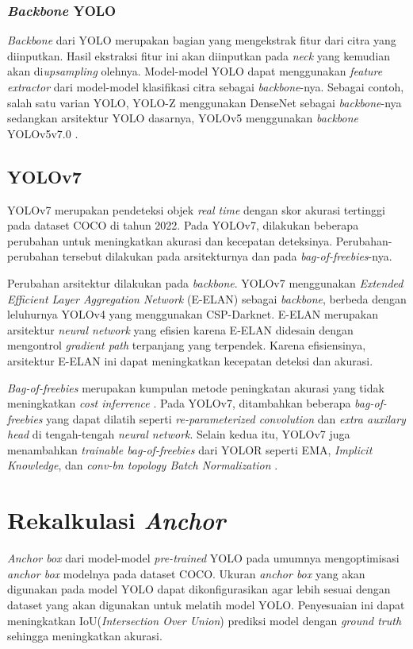     \subsubsection{\emph{Backbone} YOLO}
      \emph{Backbone} dari YOLO merupakan bagian yang mengekstrak fitur dari citra yang diinputkan.
      Hasil ekstraksi fitur ini akan diinputkan pada \emph{neck} yang kemudian akan di\emph{upsampling} olehnya.
      Model-model YOLO dapat menggunakan \emph{feature extractor} dari model-model klasifikasi citra sebagai \emph{backbone}-nya.
      Sebagai contoh, salah satu varian YOLO, YOLO-Z menggunakan DenseNet sebagai \emph{backbone}-nya sedangkan arsitektur YOLO dasarnya, YOLOv5 menggunakan \emph{backbone} YOLOv5v7.0 \parencite{yoloz}.
  
  
  
  
  \subsection{YOLOv7}
    YOLOv7 merupakan pendeteksi objek \emph{real time} dengan skor akurasi tertinggi pada dataset COCO di tahun 2022.
    Pada YOLOv7, dilakukan beberapa perubahan untuk meningkatkan akurasi dan kecepatan deteksinya.
    Perubahan-perubahan tersebut dilakukan pada arsitekturnya dan pada \emph{bag-of-freebies}-nya.
  
    Perubahan arsitektur dilakukan pada \emph{backbone}. YOLOv7 menggunakan \emph{Extended Efficient Layer Aggregation Network} (E-ELAN) sebagai \emph{backbone}, berbeda dengan leluhurnya YOLOv4 yang menggunakan CSP-Darknet.
    E-ELAN merupakan arsitektur \emph{neural network} yang efisien karena E-ELAN didesain dengan mengontrol \emph{gradient path} terpanjang yang terpendek.
    Karena efisiensinya, arsitektur E-ELAN ini dapat meningkatkan kecepatan deteksi dan akurasi. \parencite{yolov7}
  
    \emph{Bag-of-freebies} merupakan kumpulan metode peningkatan akurasi yang tidak meningkatkan \emph{cost inferrence} \parencite{yolov4}. 
    Pada YOLOv7, ditambahkan beberapa \emph{bag-of-freebies} yang dapat dilatih seperti \emph{re-parameterized convolution} dan \emph{extra auxilary head} di tengah-tengah \emph{neural network}.
    Selain kedua itu, YOLOv7 juga menambahkan \emph{trainable bag-of-freebies} dari YOLOR seperti EMA, \emph{Implicit Knowledge}, dan \emph{conv-bn topology Batch Normalization} \parencite{yolov7}.


\section{Rekalkulasi \emph{Anchor}}
  \emph{Anchor box} dari model-model \emph{pre-trained} YOLO pada umumnya mengoptimisasi \emph{anchor box} modelnya pada dataset COCO.
  Ukuran \emph{anchor box} yang akan digunakan pada model YOLO dapat dikonfigurasikan agar lebih sesuai dengan dataset yang akan digunakan untuk melatih model YOLO.
  Penyesuaian ini dapat meningkatkan IoU(\emph{Intersection Over Union}) prediksi model dengan \emph{ground truth} sehingga meningkatkan akurasi.

